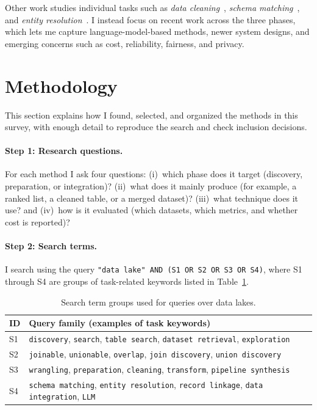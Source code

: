 \documentclass[sigconf]{acmart}
\newcommand{\tbl}{%
  \scriptsize
  \setlength{\tabcolsep}{4pt}%
  \renewcommand{\arraystretch}{1.12}%
}
\begin{document}
Other work studies individual tasks such as \emph{data cleaning}~\cite{10.14778/3675034.3675051}, \emph{schema matching}~\cite{10.14778/3742728.3742757}, and \emph{entity resolution}~\cite{10.1145/3588722}. I instead focus on recent work across the three phases, which lets me capture language-model-based methods, newer system designs, and emerging concerns such as cost, reliability, fairness, and privacy.


\section{Methodology}
\label{sec:methodology}
This section explains how I found, selected, and organized the methods in this survey, with enough detail to reproduce the search and check inclusion decisions.

\paragraph{Step 1: Research questions.}
For each method I ask four questions: (i)~which phase does it target (discovery, preparation, or integration)? (ii)~what does it mainly produce (for example, a ranked list, a cleaned table, or a merged dataset)? (iii)~what technique does it use? and (iv)~how is it evaluated (which datasets, which metrics, and whether cost is reported)?

\paragraph{Step 2: Search terms.}
I search using the query \texttt{"data lake" AND (S1 OR S2 OR S3 OR S4)}, where S1 through S4 are groups of task-related keywords listed in Table~\ref{tab:search-strings}.


\begin{table}[!htbp]
\caption{Search term groups used for queries over data lakes.}
\label{tab:search-strings}
\centering
\tbl
\begin{tabularx}{\columnwidth}{@{}p{8mm}X@{}}
\toprule
\textbf{ID} & \textbf{Query family (examples of task keywords)} \\
\midrule
S1 & \texttt{discovery}, \texttt{search}, \texttt{table search}, \texttt{dataset retrieval}, \texttt{exploration} \\
S2 & \texttt{joinable}, \texttt{unionable}, \texttt{overlap}, \texttt{join discovery}, \texttt{union discovery} \\
S3 & \texttt{wrangling}, \texttt{preparation}, \texttt{cleaning}, \texttt{transform}, \texttt{pipeline synthesis} \\
S4 & \texttt{schema matching}, \texttt{entity resolution}, \texttt{record linkage}, \texttt{data integration}, \texttt{LLM} \\
\bottomrule
\end{tabularx}
\end{table}
\end{document}
